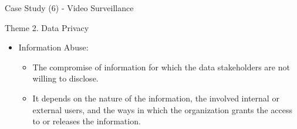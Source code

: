 \documentclass[
 size=14pt,
 paper=smartboard,  %
 mode=present, 		%
 display=slides, 	%
 style=tuliplab,  	%
 pauseslide,
 fleqn,leqno]{powerdot}
\begin{document}
\begin{slide}[toc=,bm=]{Case Study (6) - Video Surveillance}
\begin{figure}[ht]
\end{figure}

\end{slide}


\begin{slide}{Theme 2. Data Privacy}
\begin{itemize}
\item
Information Abuse:


\begin{itemize}
\item
The compromise of information
for which the data stakeholders are not willing to disclose.

\item
It depends on the nature of the information,
the involved internal or external users,
and the ways in which the organization grants the access to
or releases the information.

\end{itemize}
\end{itemize}

\end{slide}


\end{document}
